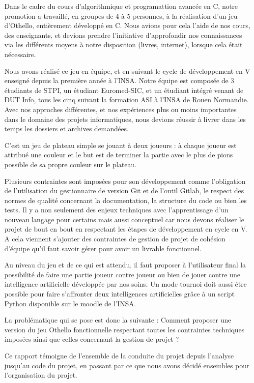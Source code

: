 \hspace{3em} Dans le cadre du cours d'algorithmique et programattion avancée en C, notre promotion a travaillé,
en groupes de 4 à 5 personnes, à la réalisation d'un jeu d'Othello, entièrement développé en C.
Nous avions pour cela l'aide de nos cours, des enseignants, et devions prendre l'initiative d'approfondir
nos connaissances via les différents moyens à notre disposition (livres, internet), lorsque cela était nécessaire.

Nous avons réalisé ce jeu en équipe, et en suivant le cycle de développement en V enseigné depuis la première
 année à l'INSA. Notre équipe est composée de 3 étudiants de STPI, un étudiant Euromed-SIC, et un étudiant intégré 
 venant de DUT Info, tous les cinq suivant la formation ASI à l'INSA de Rouen Normandie. Avec nos approches différentes, 
 et nos expériences plus ou moins importantes dans le domaine des projets informatiques, nous devions réussir à livrer 
 dans les temps les dossiers et archives demandées.

 C’est un jeu de plateau simple se jouant à deux joueurs : à chaque joueur est attribué une couleur et le but est de
 terminer la partie avec le plus de pions possible de sa propre couleur sur le plateau.

Plusieurs contraintes sont imposées pour son développement 
comme l’obligation de l’utilisation du gestionnaire de version Git et de l’outil Gitlab, le respect des 
normes de qualité concernant la documentation, la structure du code ou bien les tests. Il y a non seulement 
des enjeux techniques avec l’apprentissage d’un nouveau langage pour certains mais aussi conceptuel car
 nous devons réaliser le projet de bout en bout en respectant les étapes de développement en cycle en V. 
 A cela viennent s’ajouter des contraintes de gestion de projet de cohésion d’équipe qu’il faut savoir 
 gérer pour avoir un livrable fonctionnel.

Au niveau du jeu et de ce qui est attendu, il faut proposer à l’utilisateur final la possibilité de faire 
une partie joueur contre joueur ou bien de jouer contre une intelligence artificielle développée par nos 
soins. Un mode tournoi doit aussi être possible pour faire s’affronter deux intelligences artificielles 
grâce à un script Python disponible sur le moodle de l’INSA.

La problématique qui se pose est donc la suivante : Comment proposer une version du jeu Othello fonctionnelle 
respectant toutes les contraintes techniques imposées ainsi que celles concernant la gestion de projet ?

Ce rapport témoigne de l’ensemble de la conduite du projet depuis l’analyse jusqu’au code du projet, 
en passant par ce que nous avons décidé ensembles pour l’organisation du projet.
